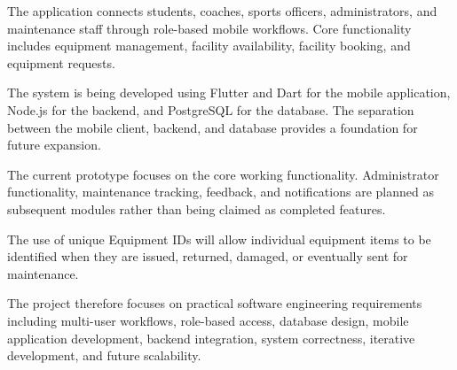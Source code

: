\documentclass[11pt,a4paper]{article}
\begin{document}
The application connects students, coaches, sports officers,
administrators, and maintenance staff through role-based mobile
workflows. Core functionality includes equipment management, facility
availability, facility booking, and equipment requests.

The system is being developed using Flutter and Dart for the mobile
application, Node.js for the backend, and PostgreSQL for the database.
The separation between the mobile client, backend, and database provides
a foundation for future expansion.

The current prototype focuses on the core working functionality.
Administrator functionality, maintenance tracking, feedback, and
notifications are planned as subsequent modules rather than being
claimed as completed features.

The use of unique Equipment IDs will allow individual equipment items to
be identified when they are issued, returned, damaged, or eventually
sent for maintenance.

The project therefore focuses on practical software engineering
requirements including multi-user workflows, role-based access,
database design, mobile application development, backend integration,
system correctness, iterative development, and future scalability.
\end{document}
